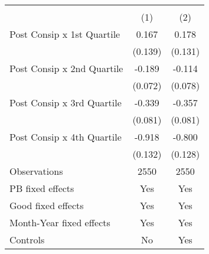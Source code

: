 \begin{tabular}{l*{2}{c}}
\hline\hline
                    &\multicolumn{2}{c}{ }    \\
                    &\multicolumn{1}{c}{(1)}&\multicolumn{1}{c}{(2)}\\
\hline
Post Consip x 1st Quartile&       0.167&       0.178\\
                    &     (0.139)&     (0.131)\\
[1em]
Post Consip x 2nd Quartile&      -0.189&      -0.114\\
                    &     (0.072)&     (0.078)\\
[1em]
Post Consip x 3rd Quartile&      -0.339&      -0.357\\
                    &     (0.081)&     (0.081)\\
[1em]
Post Consip x 4th Quartile&      -0.918&      -0.800\\
                    &     (0.132)&     (0.128)\\
\hline
Observations        &        2550&        2550\\
PB fixed effects    &         Yes&         Yes\\
Good fixed effects  &         Yes&         Yes\\
Month-Year fixed effects&         Yes&         Yes\\
Controls            &          No&         Yes\\
\hline\hline
\end{tabular}
